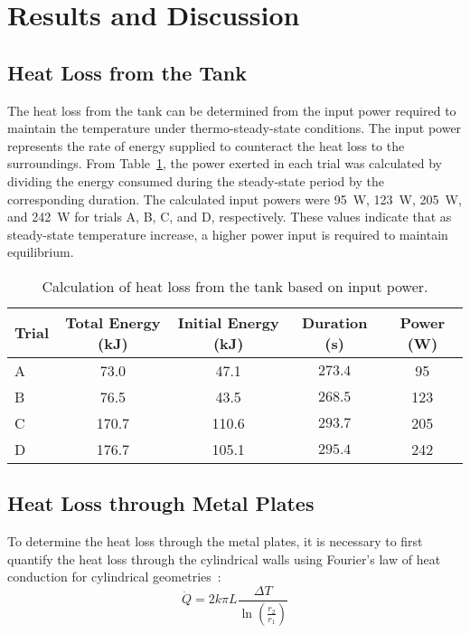 \documentclass[12pt]{article}
\begin{document}
\section*{Results and Discussion}
\subsection*{Heat Loss from the Tank}
The heat loss from the tank can be determined from the input power required to maintain the temperature under thermo-steady-state conditions. The input power represents the rate of energy supplied to counteract the heat loss to the surroundings. From Table~\ref{tab:heatloss}, the power exerted in each trial was calculated by dividing the energy consumed during the steady-state period by the corresponding duration. The calculated input powers were 95~W, 123~W, 205~W, and 242~W for trials A, B, C, and D, respectively. These values indicate that as steady-state temperature increase, a higher power input is required to maintain equilibrium.

\begin{table}[h!]
\centering
\caption{Calculation of heat loss from the tank based on input power.}
\label{tab:heatloss}
\begin{tabular}{@{}lcccc@{}}
\toprule
\textbf{Trial} & \textbf{Total Energy (kJ)} & \textbf{Initial Energy (kJ)} & \textbf{Duration (s)} & \textbf{Power (W)} \\ \midrule
A & 73.0 & 47.1 & $273.4$ & 95 \\
B & 76.5 & 43.5 & $268.5$ & 123 \\
C & 170.7 & 110.6 & $293.7$ & 205 \\
D & 176.7 & 105.1 & $295.4$ & 242 \\ \bottomrule
\end{tabular}
\end{table}

\subsection*{Heat Loss through Metal Plates}

To determine the heat loss through the metal plates, it is necessary to first quantify the heat loss through the cylindrical walls using Fourier's law of heat conduction for cylindrical geometries~\cite{che260_manual}:
\begin{equation}
\dot{Q} = 2k\pi L \frac{\Delta T}{\ln\left(\frac{r_2}{r_1}\right)}
\end{equation}
\end{document}
